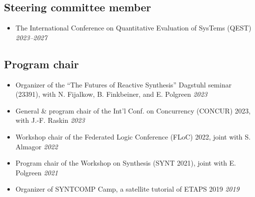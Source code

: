 \documentclass[10pt,a4paper]{moderncv}
\begin{document}
\subsection{Steering committee member}
\begin{itemize}
  \item The International Conference on Quantitative Evaluation of SysTems
    (QEST) \hfill \textit{2023--2027}
\end{itemize}

\subsection{Program chair}
\begin{itemize}
  \item Organizer of the ``The Futures of Reactive Synthesis'' Dagstuhl
    seminar (23391), with N. Fijalkow, B. Finkbeiner, and E. Polgreen \hfill
    \textit{2023}
  \item General \& program chair of the Int'l Conf. on
    Concurrency (CONCUR) 2023, with J.-F. Raskin \hfill
    \textit{2023}
  \item Workshop chair of the Federated Logic Conference (FLoC) 2022, joint
    with S. Almagor \hfill \textit{2022}
  \item Program chair of the Workshop on Synthesis (SYNT 2021), joint
    with E. Polgreen \hfill \textit{2021}
  \item Organizer of SYNTCOMP Camp, a satellite tutorial of ETAPS 2019
    \hfill \textit{2019}
\end{itemize}
\end{document}
